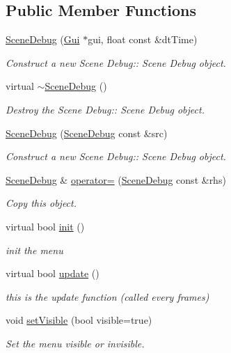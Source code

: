 \subsection*{Public Member Functions}
\begin{DoxyCompactItemize}
\item 
\hyperlink{class_scene_debug_a92210a0cef4f3fe86526378a8b27492c}{Scene\+Debug} (\hyperlink{class_gui}{Gui} $\ast$gui, float const \&dt\+Time)
\begin{DoxyCompactList}\small\item\em Construct a new Scene Debug\+:\+: Scene Debug object. \end{DoxyCompactList}\item 
\mbox{\label{class_scene_debug_abd140e9e7681ccad464f08bb473c9a9e}} 
virtual \hyperlink{class_scene_debug_abd140e9e7681ccad464f08bb473c9a9e}{$\sim$\+Scene\+Debug} ()
\begin{DoxyCompactList}\small\item\em Destroy the Scene Debug\+:\+: Scene Debug object. \end{DoxyCompactList}\item 
\hyperlink{class_scene_debug_a58950a1b730cea99216ae3c27d1e7d11}{Scene\+Debug} (\hyperlink{class_scene_debug}{Scene\+Debug} const \&src)
\begin{DoxyCompactList}\small\item\em Construct a new Scene Debug\+:\+: Scene Debug object. \end{DoxyCompactList}\item 
\hyperlink{class_scene_debug}{Scene\+Debug} \& \hyperlink{class_scene_debug_a9b6be6294dab5d220243acd2de8763e7}{operator=} (\hyperlink{class_scene_debug}{Scene\+Debug} const \&rhs)
\begin{DoxyCompactList}\small\item\em Copy this object. \end{DoxyCompactList}\item 
virtual bool \hyperlink{class_scene_debug_a4e413808e3d50dd29f9e1d07df4e6c4c}{init} ()
\begin{DoxyCompactList}\small\item\em init the menu \end{DoxyCompactList}\item 
virtual bool \hyperlink{class_scene_debug_a97234cec6e43aa3d891e3f6d2ff51528}{update} ()
\begin{DoxyCompactList}\small\item\em this is the update function (called every frames) \end{DoxyCompactList}\item 
void \hyperlink{class_scene_debug_a09bad98f967dad51ad4cf981010975de}{set\+Visible} (bool visible=true)
\begin{DoxyCompactList}\small\item\em Set the menu visible or invisible. \end{DoxyCompactList}\end{DoxyCompactItemize}
